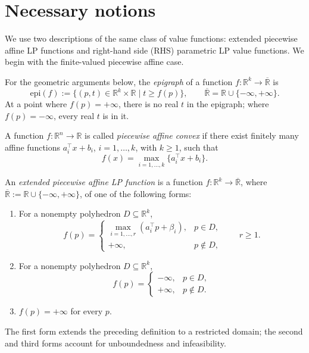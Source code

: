 \section{Necessary notions}\label{sec:lp-notions}

We use two descriptions of the same class of value functions: extended
piecewise affine LP functions and right-hand side (RHS) parametric LP value
functions. We begin with the finite-valued piecewise affine case.

For the geometric arguments below, the \emph{epigraph} of a function
$f:\mathbb{R}^k\to\overline{\mathbb{R}}$ is
\[
\mathrm{epi}(f) := \{(p,t) \in \mathbb{R}^k \times \mathbb{R} \mid t \ge f(p)\},
\qquad \overline{\mathbb{R}}=\mathbb{R}\cup\{-\infty,+\infty\}.
\]
At a point where $f(p)=+\infty$, there is no real $t$ in the epigraph;
where $f(p)=-\infty$, every real $t$ is in it.

\begin{definition}
A function $f : \mathbb{R}^n \to \mathbb{R}$ is called
\emph{piecewise affine convex} if there exist finitely many affine
functions $a_i^\top x + b_i$, $i = 1,\dots,k$, with $k\ge1$, such that
\[
f(x) = \max_{i=1,\dots,k} \{ a_i^\top x + b_i \}.
\]
\end{definition}

\begin{definition}
An \emph{extended piecewise affine LP function} is a function
$f : \mathbb{R}^k \to \overline{\mathbb{R}}$, where
$\overline{\mathbb{R}} := \mathbb{R} \cup \{-\infty,+\infty\}$,
of one of the following forms:
\begin{enumerate}
\item For a nonempty polyhedron $D \subseteq \mathbb{R}^k$,
\[
f(p) = \begin{cases}
\max_{i=1,\dots,r}(a_i^\top p+\beta_i), & p \in D,\\
+\infty, & p \notin D,
\end{cases}
\qquad r \ge 1.
\]
\item For a nonempty polyhedron $D \subseteq \mathbb{R}^k$,
\[
f(p) = \begin{cases}
-\infty, & p \in D,\\
+\infty, & p \notin D.
\end{cases}
\]
\item $f(p)=+\infty$ for every $p$.
\end{enumerate}
The first form extends the preceding definition to a restricted domain;
the second and third forms account for unboundedness and infeasibility.
\end{definition}

